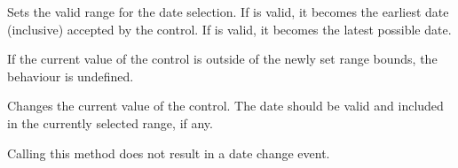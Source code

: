 
Sets the valid range for the date selection. If  is valid, it becomes
the earliest date (inclusive) accepted by the control. If  is valid,
it becomes the latest possible date.


If the current value of the control is outside of the newly set range bounds,
the behaviour is undefined.


\label{wxdatepickerctrlsetvalue}


Changes the current value of the control. The date should be valid and included
in the currently selected range, if any.

Calling this method does not result in a date change event.


